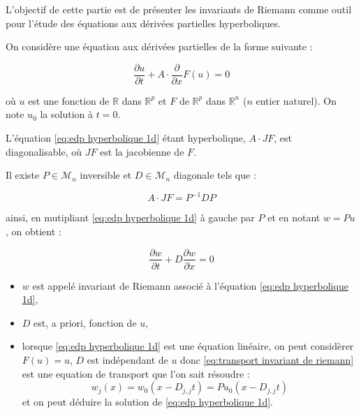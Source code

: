 
L'objectif de cette partie est de présenter les invariants de Riemann comme outil pour l'étude des équations aux dérivées partielles hyperboliques.

On considère une équation aux dérivées partielles de la forme suivante :

\begin{equation}
\dfrac{\partial u}{\partial t} + A \cdot \dfrac{\partial}{\partial x} F(u) = 0
\label{eq:edp hyperbolique 1d}
\end{equation}

où $u$ est une fonction de $\mathbb{R}$ dans $\mathbb{R}^p$ et $F$ de $\mathbb{R}^p$ dans $\mathbb{R}^n$ ($n$ entier naturel). On note $u_0$ la solution à $t=0$.

L'équation \eqref{eq:edp hyperbolique 1d} étant hyperbolique, $A  \cdot J F$, est diagonalisable, où $J F$ est la jacobienne de $F$.

Il existe $P \in \mathcal{M}_n$ inversible et $D \in \mathcal{M}_ n$ diagonale tels que :

\begin{equation}
A \cdot JF = P^{-1} D P
\end{equation}

ainsi, en mutipliant \eqref{eq:edp hyperbolique 1d} à gauche par $P$ et en notant $w = P u$, on obtient :

\begin{equation}
\dfrac{\partial w}{\partial t} + D \dfrac{\partial w}{\partial x} = 0
\label{eq:transport invariant de riemann}
\end{equation}

\begin{remarque}
\begin{itemize}
\item $w$ est appelé invariant de Riemann associé à l'équation \eqref{eq:edp hyperbolique 1d},
\item $D$ est, a priori, fonction de $u$,
\item lorsque \eqref{eq:edp hyperbolique 1d} est une équation linéaire, on peut considèrer $F(u) = u$, $D$ est indépendant de $u$ donc \eqref{eq:transport invariant de riemann} est une equation de transport que l'on sait résoudre :
\begin{equation}
w_j(x) = w_0 ( x - D_{j,j} t) = P u_0 ( x - D_{j,j} t )
\end{equation} 
et on peut déduire la solution de \eqref{eq:edp hyperbolique 1d}.
\end{itemize}
\end{remarque}